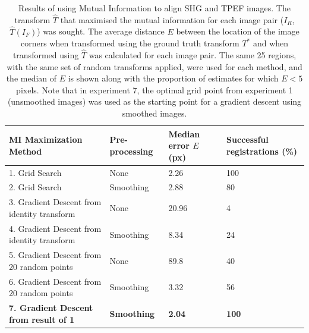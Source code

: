 \documentclass{report}
\begin{document}
\begin{table}
\centering

\begin{tabular}{|p{1.55in}|p{0.75in}|p{1.5in}|p{1.2in}|}
\hline
\textbf{MI Maximization Method} & \textbf{Pre-processing} & \textbf{Median error $E$ (px)} & \textbf{Successful registrations (\%)} \\

\hline
\hline
1. Grid Search & None & 2.26 & 100  \\
\hline
2. Grid Search & Smoothing & 2.88 & 80  \\
\hline
3. Gradient Descent from identity transform & None & 20.96  & 4 \\ 
\hline
4. Gradient Descent from identity transform & Smoothing & 8.34  & 24 \\ 
\hline
5. Gradient Descent from 20 random points & None & 89.8  & 40 \\ 
\hline
6. Gradient Descent from 20 random points & Smoothing & 3.32  & 56 \\
\hline
\textbf{7. Gradient Descent from result of 1} & \textbf{Smoothing} & \textbf{2.04}  & \textbf{100} \\ 
\hline
\end{tabular}
\caption{Results of using Mutual Information to align SHG and TPEF images. The transform $\hat{T}$ that maximised the mutual information for each image pair ($I_R$, $\hat{T}(I_F)$) was sought. The average distance $E$ between the location of the image corners when transformed using the ground truth transform $T^*$ and when transformed using $\hat{T}$ was calculated for each image pair. The same 25 regions, with the same set of random transforms applied, were used for each method, and the median of $E$ is shown along with the proportion of estimates for which $E<5$ pixels. Note that in experiment 7, the optimal grid point from experiment 1 (unsmoothed images) was used as the starting point for a gradient descent using smoothed images.}
\label{tab:MIresults}
\end{table}
\end{document}
